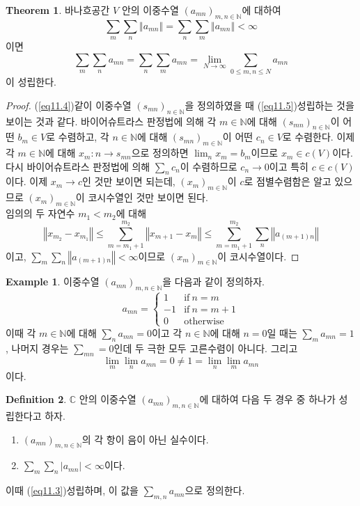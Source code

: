 \documentclass[11pt]{book}
\numberwithin{equation}{chapter}
\def\NN{\mathbb{N}}
\def\CC{\mathbb{C}}
\newcommand{\abs}[1]{\left\vert#1\right\vert}
\newcommand{\norm}[1]{\left\Vert#1\right\Vert}
\def\textif{\text{if}}
\def\otw{\text{otherwise}}
\theoremstyle{definition}
\newtheorem{thm}{Theorem}[section]
\newtheorem{defn}[thm]{Definition}
\newtheorem*{ex}{Example}
\newenvironment{enum}
	{\begin{enumerate}[label=(\alph*), leftmargin=2\parindent]}
	{\end{enumerate}}
\begin{document}
\begin{thm}
    바나흐공간 \(V\) 안의 이중수열 \((a_{mn})_{m,n\in \NN}\)에 대하여
    \[
    \sum_{m} \sum_n \norm{a_{mn}} = \sum_n \sum_m \norm{a_{mn}} < \infty    
    \]
    이면
    \begin{equation} \label{eq11.3}
        \sum_m \sum_n a_{mn} = \sum_n \sum_m a_{mn} = \lim_{N \to \infty} \sum_{0 \le m, n \le N} a_{mn}    
    \end{equation}
    이 성립한다.
\end{thm}
\begin{proof}
    (\ref{eq11.4})\와 같이 이중수열 \((s_{mn})_{n \in \NN}\)을 정의하였을 때 (\ref{eq11.5})\가 성립하는 것을 보이는 것과 같다. 바이어슈트라스 판정법에 의해 각 \(m \in \NN\)에 대해 \((s_{mn})_{n \in \NN}\)이 어떤 \(b_m \in V\)로 수렴하고, 각 \(n \in \NN\)에 대해 \((s_{mn})_{m \in \NN}\)이 어떤 \(c_n \in V\)로 수렴한다. 이제 각 \(m \in \NN\)에 대해 \(x_m : n \to s_{mn}\)으로 정의하면 \(\lim_n x_m = b_m\)이므로 \(x_m \in c(V)\)이다. 다시 바이어슈트라스 판정법에 의해 \(\sum_n c_n\)이 수렴하므로 \(c_n \to 0\)이고 특히 \(c \in c(V)\)이다. 이제 \(x_m \to c\)인 것만 보이면 되는데, \((x_m)_{m \in \NN}\)이 \(c\)로 점별수렴함은 알고 있으므로 \((x_m)_{m \in \NN}\)이 코시수열인 것만 보이면 된다.\\
    임의의 두 자연수 \(m_1 < m_2\)에 대해
    \[
    \norm{x_{m_2} - x_{m_1}} \le \sum_{m=m_1+1}^{m_2} \norm{x_{m+1} - x_m} \le \sum_{m=m_1+1}^{m_2} \sum_n \norm{a_{(m+1)n}}
    \]
    이고, \(\sum_m \sum_n \norm{a_{(m+1)n}} < \infty\)이므로 \((x_m)_{m \in \NN}\)이 코시수열이다.
\end{proof}

\begin{ex}
    이중수열 \((a_{mn})_{m,n \in \NN}\)을 다음과 같이 정의하자.
    \[
    a_{mn} =    
    \begin{cases}
        1 &\textif \ n = m\\
        -1 &\textif \ n = m+1\\
        0 &\otw
    \end{cases}
    \]
    이때 각 \(m \in \NN\)에 대해 \(\sum_n a_{mn} = 0\)이고 각 \(n \in \NN\)에 대해 \(n = 0\)일 때는 \(\sum_m a_{mn} = 1\), 나머지 경우는 \(\sum_{mn} = 0\)인데 두 극한 모두 고른수렴이 아니다. 그리고
    \[
        \lim_m \lim_n a_{mn} = 0 \ne 1 = \lim_n \lim_m a_{mn} 
    \]
    이다.
\end{ex}

\begin{defn} \label{11.2.6}
    \(\CC\) 안의 이중수열 \((a_{mn})_{m, n \in \NN}\)에 대하여 다음 두 경우 중 하나가 성립한다고 하자.
    \begin{enum}
        \item \((a_{mn})_{m, n \in \NN}\)의 각 항이 음이 아닌 실수이다.
        \item \(\sum_m \sum_n \abs{a_{mn}} < \infty\)이다.
    \end{enum}
    이때 (\ref{eq11.3})\이 성립하며, 이 값을 \(\sum_{m,n} a_{mn}\)으로 정의한다.
\end{defn}
\end{document}
